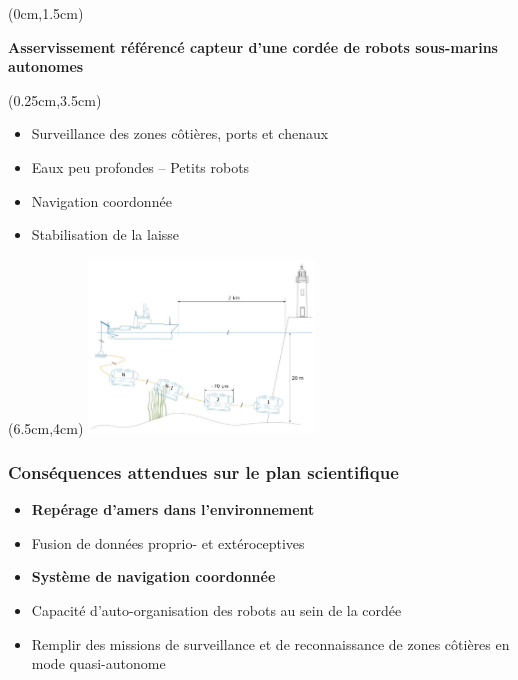 \documentclass[10pt]{beamer}
\begin{document}
\begin{frame}
\begin{textblock*}{12.8cm}(0cm,1.5cm) %
\begin{center}
{\textbf{Asservissement référencé capteur d'une cordée de robots sous-marins autonomes}}  \\
\end{center}
\end{textblock*}
\begin{textblock*}{8.5cm}(0.25cm,3.5cm) %
\begin{itemize}
\item Surveillance des zones côtières, ports et chenaux
\item Eaux peu profondes – Petits robots
\item Navigation coordonnée 
\item Stabilisation de la laisse
\end{itemize}
\end{textblock*}
\begin{textblock*}{5.2cm}(6.5cm,4cm) %
\includegraphics[width=6cm, keepaspectratio]{Pictures/cordee.png}
\end{textblock*}
\end{frame}

\begin{frame}
\frametitle{Conséquences attendues sur le plan scientifique}
\begin{itemize}
\item \textbf<2->{Repérage d'amers dans l'environnement} \\
\item Fusion de données proprio- et extéroceptives \\
\item \textbf<2->{Système de navigation coordonnée} \\
\item Capacité d'auto-organisation des robots au sein de la cordée \\
\item Remplir des missions de surveillance et de reconnaissance de zones côtières en mode quasi-autonome \\
\end{itemize}
\end{frame}
\end{document}
